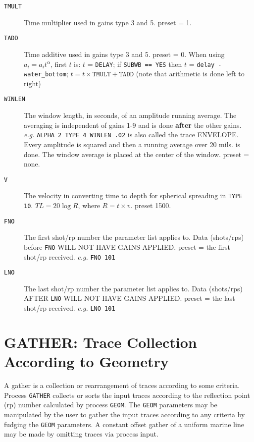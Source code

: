 \begin{description}
\item[\texttt{TMULT}] Time multiplier used in gains type 3 and 5.  \Gls{preset} = 1.
\item[\texttt{TADD}] Time additive used in gains type 3 and 5.  \Gls{preset} = 0.
         When using $a_{i} = a_{i} t^{\alpha}$, first $t$ is:
         $t$ = \texttt{DELAY}; if \texttt{SUBWB == YES} then $t$ = \texttt{delay - water\_bottom};
         $t = t \times \texttt{TMULT} + \texttt{TADD}$
         (note that arithmetic is done left to right)

\item[\texttt{WINLEN}] The window length, in seconds, of an amplitude running average.
    The averaging is independent of gains 1-9 and is done \textbf{after}
         the other gains.  \textit{e.g.} \texttt{ALPHA 2 TYPE 4 WINLEN .02} is also
         called the trace ENVELOPE.  Every amplitude is squared and
         then a running average over 20 mils. is done.  The window
         average is placed at the center of the window.
         \Gls{preset} = none.

\item[\texttt{V}] The velocity in converting time to depth for spherical spreading
         in \texttt{TYPE 10}.  $TL = 20 \log{R}$, where $R = t \times v$.
         \Gls{preset} 1500.

\item[\texttt{FNO}] The first \gls{shot}/\gls{rp} number the parameter list applies to.  Data
         (\glspl{shot}/\glspl{rp}) before \texttt{FNO} WILL NOT HAVE GAINS APPLIED.
         \Gls{preset} = the first \gls{shot}/\gls{rp} received.    \textit{e.g.}   \texttt{FNO 101}

\item[\texttt{LNO}] The last \gls{shot}/\gls{rp} number the parameter list applies to.  Data
         (\glspl{shot}/\glspl{rp}) AFTER \texttt{LNO} WILL NOT HAVE GAINS APPLIED.
         \Gls{preset} = the last \gls{shot}/\gls{rp} received.     \textit{e.g.}   \texttt{LNO 101}
\end{description}

\section{GATHER: Trace Collection According to Geometry}
\label{cmd_gather}

A \gls{gather} is a collection or rearrangement of traces according to some
criteria.  Process \texttt{GATHER} collects or sorts the input traces according
to the reflection point (\gls{rp}) number calculated by process \texttt{GEOM}.  The
\texttt{GEOM} parameters may be manipulated by the user to gather the input
traces according to any criteria by fudging the \texttt{GEOM} parameters.
A constant offset \gls{gather} of a uniform marine line may be made by
omitting traces via process input.

